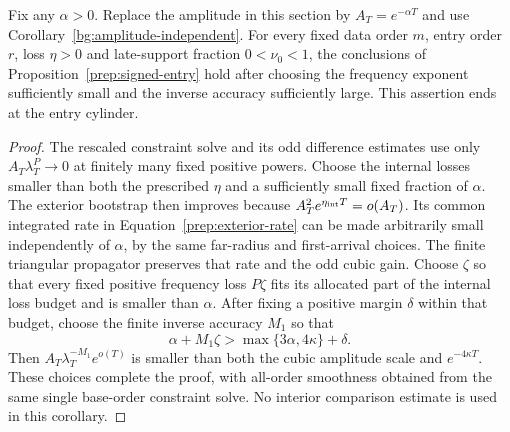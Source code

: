 \begin{corollary}
\label{prep:amplitude-independent-exterior}
Fix any $\alpha>0$. Replace the amplitude in this section by
$A_T=e^{-\alpha T}$ and use Corollary~\ref{bg:amplitude-independent}.
For every fixed data order $m$, entry order $r$, loss $\eta>0$ and
late-support fraction $0<\nu_0<1$, the conclusions of
Proposition~\ref{prep:signed-entry} hold after choosing the frequency
exponent sufficiently small and the inverse accuracy sufficiently
large. This assertion ends at the entry cylinder.
\end{corollary}
\begin{proof}
The rescaled constraint solve and its odd difference estimates use
only $A_T\lambda_T^P\to0$ at finitely many fixed positive powers.
Choose the internal losses smaller than both the prescribed $\eta$
and a sufficiently small fixed fraction of $\alpha$. The exterior
bootstrap then improves because $A_T^2e^{\eta_{\rm int}T}=o(A_T)$.
Its common integrated rate in Equation~\eqref{prep:exterior-rate}
can be made arbitrarily small independently of $\alpha$, by the
same far-radius and first-arrival choices. The finite triangular
propagator preserves that rate and the odd cubic gain. Choose $\zeta$ so that every fixed positive frequency loss
$P\zeta$ fits its allocated part of the internal loss budget and is
smaller than $\alpha$. After fixing a positive margin $\delta$
within that budget, choose the finite inverse accuracy $M_1$ so that
\[
 \alpha+M_1\zeta>\max\{3\alpha,4\kappa\}+\delta.
\]
Then $A_T\lambda_T^{-M_1}e^{o(T)}$ is smaller than both the
cubic amplitude scale and $e^{-4\kappa T}$. These choices
complete the proof, with all-order smoothness obtained from the same
single base-order constraint solve. No interior comparison estimate
is used in this corollary.
\end{proof}
